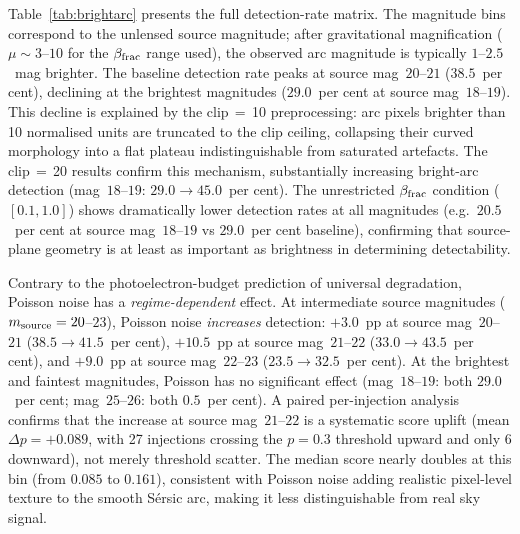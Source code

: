 \documentclass[fleqn,usenatbib]{mnras}
\begin{document}
Table~\ref{tab:brightarc} presents the full detection-rate matrix.  The magnitude bins correspond to the unlensed source magnitude; after gravitational magnification ($\mu \sim 3$--$10$ for the $\beta_{\rm frac}$ range used), the observed arc magnitude is typically $1$--$2.5$~mag brighter.  The baseline detection rate peaks at source mag~$20$--$21$ ($38.5$~per cent), declining at the brightest magnitudes ($29.0$~per cent at source mag~$18$--$19$).  This decline is explained by the clip$\,=\,$10 preprocessing: arc pixels brighter than 10 normalised units are truncated to the clip ceiling, collapsing their curved morphology into a flat plateau indistinguishable from saturated artefacts.  The clip$\,=\,$20 results confirm this mechanism, substantially increasing bright-arc detection (mag~$18$--$19$: $29.0 \to 45.0$~per cent).  The unrestricted $\beta_{\rm frac}$ condition ($[0.1, 1.0]$) shows dramatically lower detection rates at all magnitudes (e.g.\ $20.5$~per cent at source mag~$18$--$19$ vs $29.0$~per cent baseline), confirming that source-plane geometry is at least as important as brightness in determining detectability.

Contrary to the photoelectron-budget prediction of universal degradation, Poisson noise has a \emph{regime-dependent} effect.  At intermediate source magnitudes ($m_{\rm source} = 20$--$23$), Poisson noise \emph{increases} detection: $+3.0$~pp at source mag~$20$--$21$ ($38.5 \to 41.5$~per cent), $+10.5$~pp at source mag~$21$--$22$ ($33.0 \to 43.5$~per cent), and $+9.0$~pp at source mag~$22$--$23$ ($23.5 \to 32.5$~per cent).  At the brightest and faintest magnitudes, Poisson has no significant effect (mag~$18$--$19$: both $29.0$~per cent; mag~$25$--$26$: both $0.5$~per cent).  A paired per-injection analysis confirms that the increase at source mag~$21$--$22$ is a systematic score uplift (mean $\Delta p = +0.089$, with 27 injections crossing the $p = 0.3$ threshold upward and only 6 downward), not merely threshold scatter.  The median score nearly doubles at this bin (from $0.085$ to $0.161$), consistent with Poisson noise adding realistic pixel-level texture to the smooth S\'{e}rsic arc, making it less distinguishable from real sky signal.
\end{document}
